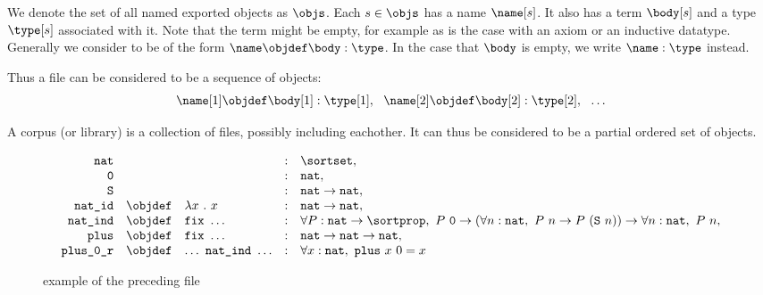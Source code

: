 \begin{definition}[{\coqobj[s]}]
	We denote the set of all named exported \coq objects as $\objs$.
	Each \coqobj $s \in \objs$ has a name $\name[s]$.
	It also has a term $\body[s]$ and a type $\type[s]$ associated with it.
	Note that the term might be empty, for example as is the case with an axiom or an inductive datatype.
	Generally we consider \coqobj[s] to be of the form $\name \objdef \body : \type$.
	In the case that $\body$ is empty, we write $\name : \type$ instead.
\end{definition}

Thus a \coq file can be considered to be a sequence of \coq objects:
$$ \name[1] \objdef \body[1] : \type[1], ~~ \name[2] \objdef \body[2] : \type[2], ~~ \ldots $$

A \coq corpus (or library) is a collection of \coq files, possibly including eachother.
It can thus be considered to be a partial ordered set of \coq objects.

\begin{figure}[H]
	$$
		\begin{array}{rclcl}
			\texttt{nat} & & & : & \sortset, \\
			\texttt{0} & & & : & \texttt{nat}, \\
			\texttt{S} & & & : & \texttt{nat} \rightarrow \texttt{nat}, \\
			\texttt{nat\_id} & \objdef & \lambda x~.~x & : & \texttt{nat} \rightarrow \texttt{nat}, \\
			\texttt{nat\_ind} & \objdef & \texttt{fix}~\ldots & : &
				\forall P : \texttt{nat} \rightarrow \sortprop,~
				P~\texttt{0} \rightarrow (\forall n : \texttt{nat},~ P~n \rightarrow P~(\texttt{S}~n)) \rightarrow \forall n : \texttt{nat},~ P~n, \\
			\texttt{plus} & \objdef & \texttt{fix}~\ldots & : & \texttt{nat} \rightarrow \texttt{nat} \rightarrow \texttt{nat}, \\
			\texttt{plus\_0\_r} & \objdef & \ldots~\texttt{nat\_ind}~\ldots & : & \forall x : \texttt{nat},~ \texttt{plus}~x~0 = x
		\end{array}
	$$
	\caption{\coqobj example of the preceding \coq file}
\end{figure}

